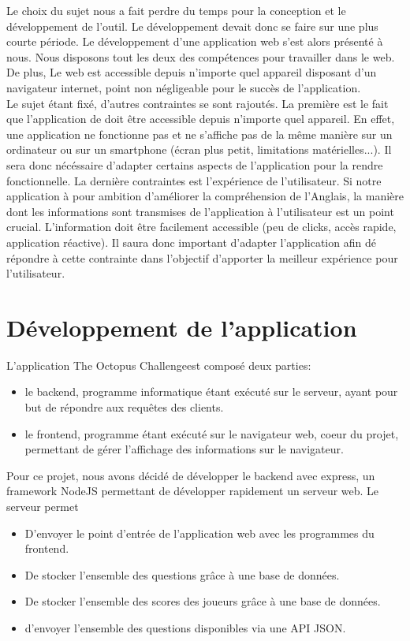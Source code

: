 \documentclass[a4paper,11pt, oneside]{book}
\def\appName{The Octopus Challenge}
\begin{document}
Le choix du sujet nous a fait perdre du temps pour la conception et le développement de l'outil. Le développement devait donc se faire sur une plus courte période.
Le développement d'une application web s'est alors présenté à nous. Nous disposons tout les deux des compétences pour travailler dans le web.
De plus, Le web est accessible depuis n'importe quel appareil disposant d'un navigateur internet, point non négligeable pour le succès de l'application.\\

Le sujet étant fixé, d'autres contraintes se sont rajoutés. La première est le fait que l'application de doit être accessible depuis n'importe quel appareil. En effet,
une application ne fonctionne pas et ne s'affiche pas de la même manière sur un ordinateur ou sur un smartphone (écran plus petit, limitations matérielles...). Il sera donc nécéssaire
d'adapter certains aspects de l'application pour la rendre fonctionnelle. La dernière contraintes est l'expérience de l'utilisateur. Si notre application à pour ambition d'améliorer
la compréhension de l'Anglais, la manière dont les informations sont transmises de l'application à l'utilisateur est un point crucial. L'information doit être facilement accessible (peu de clicks, accès rapide, application réactive).
Il saura donc important d'adapter l'application afin dé répondre à cette contrainte dans l'objectif d'apporter la meilleur expérience pour l'utilisateur.


\section{Développement de l'application}


L'application \appName est composé deux parties:
\begin{itemize}
	\item le backend, programme informatique étant exécuté sur le serveur, ayant pour but de répondre aux requêtes des clients.
	\item le frontend, programme étant exécuté sur le navigateur web, coeur du projet, permettant de gérer l'affichage des informations sur le navigateur.\\
\end{itemize}

\noindent Pour ce projet, nous avons décidé de développer le backend avec express, un framework NodeJS permettant de développer rapidement un serveur web. Le serveur permet
\begin{itemize}
	\item D'envoyer le point d'entrée de l'application web avec les programmes du frontend.
	\item De stocker l'ensemble des questions grâce à une base de données.
	\item De stocker l'ensemble des scores des joueurs grâce à une base de données.
	\item d'envoyer l'ensemble des questions disponibles via une API JSON.\\
\end{itemize}
\end{document}
